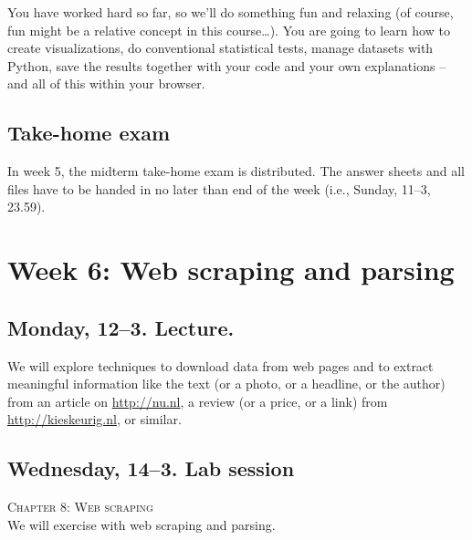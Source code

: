 \documentclass[a4paper,12pt]{report}
\begin{document}
You have worked hard so far, so we'll do something fun and relaxing (of course, fun might be a relative concept in this course\ldots). You are going to learn how to create visualizations, do conventional statistical tests, manage datasets with Python, save the results together with your code and your own explanations -- and all of this within your browser.



\subsection*{Take-home exam}
In week 5, the midterm take-home exam is distributed. The answer sheets and all files have to be handed in no later than end of the week (i.e., Sunday, 11--3, 23.59).




\section*{Week 6: Web scraping and parsing}

\subsection*{Monday, 12--3. Lecture.}
We will explore techniques to download data from web pages and to extract meaningful information like the text (or a photo, or a headline, or the author) from an article on \url{http://nu.nl}, a review (or a price, or a link) from \url{http://kieskeurig.nl}, or similar. 

\subsection*{Wednesday, 14--3. Lab session}
\textsc{ Chapter 8: Web scraping}\\
We will exercise with web scraping and parsing.

%
%
%
%
%
%
\end{document}
